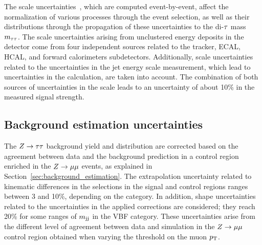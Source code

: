 The \etvecmiss scale uncertainties~\cite{CMS-JME-12-002}, which are computed event-by-event, affect the normalization of 
various processes through the event selection, as well as their distributions through the propagation of these uncertainties 
to the di-$\tau$ mass $m_{\tau\tau}$. The \etvecmiss scale uncertainties arising from unclustered energy deposits in the detector 
come from four independent sources related to the tracker, ECAL, HCAL, and forward calorimeters subdetectors. Additionally, 
\etvecmiss scale uncertainties related to the uncertainties in the jet energy scale measurement, which lead to 
uncertainties in the \etvecmiss calculation, are taken into account. The combination of both sources of uncertainties in 
the \etvecmiss scale leads to an uncertainty of about 10\% in the measured signal strength.

\subsection{Background estimation uncertainties}

The $Z\to\tau\tau$ background yield and distribution are corrected based on the agreement between data and the 
background prediction in a control region enriched in the $Z\to\mu\mu$ events, as explained in 
Section~\ref{sec:background_estimation}. The extrapolation uncertainty related to kinematic differences in the selections 
in the signal and control regions ranges between 3 and 10\%, depending
on the category. In addition, shape uncertainties related to the uncertainties in the applied corrections are considered; 
they reach 20\% for some ranges of $m_\mathrm{jj}$ in the VBF category. These uncertainties arise from the different level of 
agreement between data and simulation in the $Z\to\mu\mu$ control region obtained when varying the threshold on the muon $p_\mathrm{T}$.

